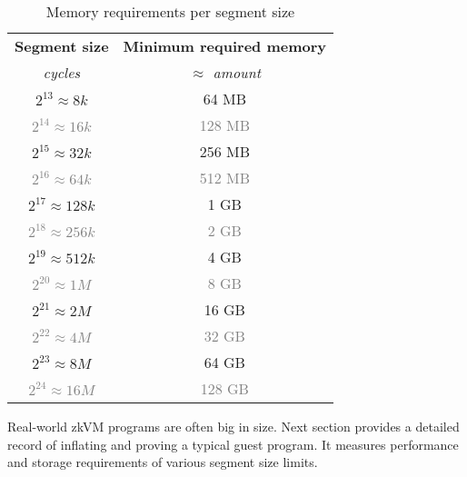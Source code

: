\documentclass[a4paper, 10pt]{article}
\begin{document}
\begin{table}[h!]
  \begin{center}
    \small
    \label{tab:table1}
    \begin{tabular}{c|c}
	  \textbf{Segment size} & \textbf{Minimum required memory}\\
	  \textit{cycles} & \textit{$\approx$ amount}\\
	  \hline
	  $2^{13} \approx 8k$  & 64 MB\\
	  \textcolor{gray}{$2^{14} \approx 16k$} & \textcolor{gray}{128 MB}\\
      $2^{15} \approx 32k$ & 256 MB\\
      \textcolor{gray}{$2^{16} \approx 64k$} & \textcolor{gray}{512 MB}\\
      $2^{17} \approx 128k$ & 1 GB\\
      \textcolor{gray}{$2^{18} \approx 256k$} & \textcolor{gray}{2 GB}\\
      $2^{19} \approx 512k$ & 4 GB\\
      \textcolor{gray}{$2^{20} \approx 1M$} & \textcolor{gray}{8 GB}\\
      $2^{21} \approx 2M$ & 16 GB\\
      \textcolor{gray}{$2^{22} \approx 4M$} & \textcolor{gray}{32 GB}\\
      $2^{23} \approx 8M$ & 64 GB\\
      \textcolor{gray}{$2^{24} \approx 16M$} & \textcolor{gray}{128 GB}\\
    \end{tabular}
    \caption{Memory requirements per segment size}
  \end{center}
\end{table}
\par
Real-world zkVM programs are often big in size. Next section provides a detailed record of inflating and proving a typical guest program. It measures performance and storage requirements of various segment size limits. 
\end{document}
